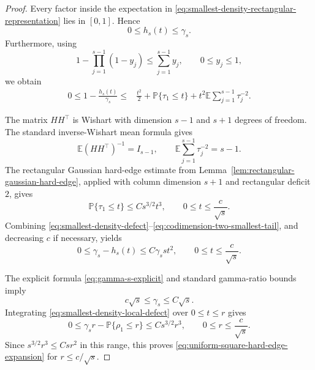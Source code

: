 \documentclass[11pt]{article}
\newcommand{\Pbb}{\mathbb P}
\newcommand{\Ebb}{\mathbb E}
\newcommand{\1}{\mathbf 1}
\begin{document}
\begin{proof}
Every factor inside the expectation in
\eqref{eq:smallest-density-rectangular-representation} lies in \([0,1]\).  Hence
\begin{equation}
        0\le h_s(t)\le\gamma_s.
        \label{eq:smallest-density-monotonic-upper-bound}
\end{equation}
Furthermore, using
\[
        1-\prod_{j=1}^{s-1}(1-y_j)
        \le
        \sum_{j=1}^{s-1}y_j,
        \qquad 0\le y_j\le1,
\]
we obtain
\begin{align}
        0
        \le
        1-\frac{h_s(t)}{\gamma_s}
        \le{}&
        \frac{t^2}{2}
        +
        \Pbb\{\tau_1\le t\}
        +
        t^2\Ebb\sum_{j=1}^{s-1}\tau_j^{-2}.
        \label{eq:smallest-density-defect}
\end{align}

The matrix \(HH^\top\) is Wishart with dimension \(s-1\) and \(s+1\) degrees of freedom.
The standard inverse-Wishart mean formula gives
\begin{equation}
        \Ebb(HH^\top)^{-1}
        =
        I_{s-1},
        \qquad
        \Ebb\sum_{j=1}^{s-1}\tau_j^{-2}
        =
        s-1.
        \label{eq:codimension-two-inverse-trace}
\end{equation}
The rectangular Gaussian hard-edge estimate from
Lemma~\ref{lem:rectangular-gaussian-hard-edge}, applied with column dimension \(s+1\)
and rectangular deficit \(2\), gives
\begin{equation}
        \Pbb\{\tau_1\le t\}
        \le
        C s^{3/2}t^3,
        \qquad
        0\le t\le\frac{c}{\sqrt{s}}.
        \label{eq:codimension-two-smallest-tail}
\end{equation}
Combining \eqref{eq:smallest-density-defect}--\eqref{eq:codimension-two-smallest-tail},
and decreasing \(c\) if necessary, yields
\begin{equation}
        0
        \le
        \gamma_s-h_s(t)
        \le
        C\gamma_s s t^2,
        \qquad
        0\le t\le\frac{c}{\sqrt{s}}.
        \label{eq:smallest-density-local-defect}
\end{equation}

The explicit formula \eqref{eq:gamma-s-explicit} and standard gamma-ratio bounds imply
\[
        c\sqrt{s}\le\gamma_s\le C\sqrt{s}.
\]
Integrating \eqref{eq:smallest-density-local-defect} over \(0\le t\le r\) gives
\begin{equation}
        0
        \le
        \gamma_s r-\Pbb\{\rho_1\le r\}
        \le
        Cs^{3/2}r^3,
        \qquad
        0\le r\le\frac{c}{\sqrt{s}}.
        \label{eq:smallest-cdf-local-remainder}
\end{equation}
Since \(s^{3/2}r^3\le Csr^2\) in this range, this proves
\eqref{eq:uniform-square-hard-edge-expansion} for
\(r\le c/\sqrt{s}\).


\end{proof}
\end{document}
